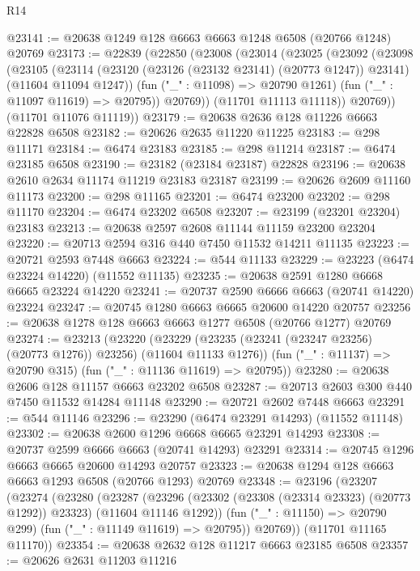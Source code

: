 \begin{lexlean}{R14}
\begin{coremodule}
@23141 := @20638 @1249 @128 @6663 @6663 @1248 @6508 (@20766 @1248) @20769
@23173 := @22839
    (@22850
      (@23008
        (@23014
          (@23025
            (@23092
              (@23098
                (@23105
                  (@23114
                    (@23120 (@23126 (@23132 @23141) (@20773 @1247)) @23141)
                    (@11604 @11094 @1247))
                  (fun ("_" : @11098) => @20790 @1261)
                  (fun ("_" : @11097 @11619) => @20795))
                @20769))
            (@11701 @11113 @11118))
          @20769))
      (@11701 @11076 @11119))
@23179 := @20638 @2636 @128 @11226 @6663 @22828 @6508
@23182 := @20626 @2635 @11220 @11225
@23183 := @298 @11171
@23184 := @6474 @23183
@23185 := @298 @11214
@23187 := @6474 @23185 @6508
@23190 := @23182 (@23184 @23187) @22828
@23196 := @20638 @2610 @2634 @11174 @11219 @23183 @23187
@23199 := @20626 @2609 @11160 @11173
@23200 := @298 @11165
@23201 := @6474 @23200
@23202 := @298 @11170
@23204 := @6474 @23202 @6508
@23207 := @23199 (@23201 @23204) @23183
@23213 := @20638 @2597 @2608 @11144 @11159 @23200 @23204
@23220 := @20713 @2594 @316 @440 @7450 @11532 @14211 @11135
@23223 := @20721 @2593 @7448 @6663
@23224 := @544 @11133
@23229 := @23223 (@6474 @23224 @14220) (@11552 @11135)
@23235 := @20638 @2591 @1280 @6668 @6665 @23224 @14220
@23241 := @20737 @2590 @6666 @6663 (@20741 @14220) @23224
@23247 := @20745 @1280 @6663 @6665 @20600 @14220 @20757
@23256 := @20638 @1278 @128 @6663 @6663 @1277 @6508 (@20766 @1277) @20769
@23274 := @23213
    (@23220
      (@23229 (@23235 (@23241 (@23247 @23256) (@20773 @1276)) @23256) (@11604 @11133 @1276))
      (fun ("_" : @11137) => @20790 @315)
      (fun ("_" : @11136 @11619) => @20795))
@23280 := @20638 @2606 @128 @11157 @6663 @23202 @6508
@23287 := @20713 @2603 @300 @440 @7450 @11532 @14284 @11148
@23290 := @20721 @2602 @7448 @6663
@23291 := @544 @11146
@23296 := @23290 (@6474 @23291 @14293) (@11552 @11148)
@23302 := @20638 @2600 @1296 @6668 @6665 @23291 @14293
@23308 := @20737 @2599 @6666 @6663 (@20741 @14293) @23291
@23314 := @20745 @1296 @6663 @6665 @20600 @14293 @20757
@23323 := @20638 @1294 @128 @6663 @6663 @1293 @6508 (@20766 @1293) @20769
@23348 := @23196
    (@23207
      (@23274
        (@23280
          (@23287
            (@23296 (@23302 (@23308 (@23314 @23323) (@20773 @1292)) @23323) (@11604 @11146 @1292))
            (fun ("_" : @11150) => @20790 @299)
            (fun ("_" : @11149 @11619) => @20795))
          @20769))
      (@11701 @11165 @11170))
@23354 := @20638 @2632 @128 @11217 @6663 @23185 @6508
@23357 := @20626 @2631 @11203 @11216

\end{coremodule}
\end{lexlean}
